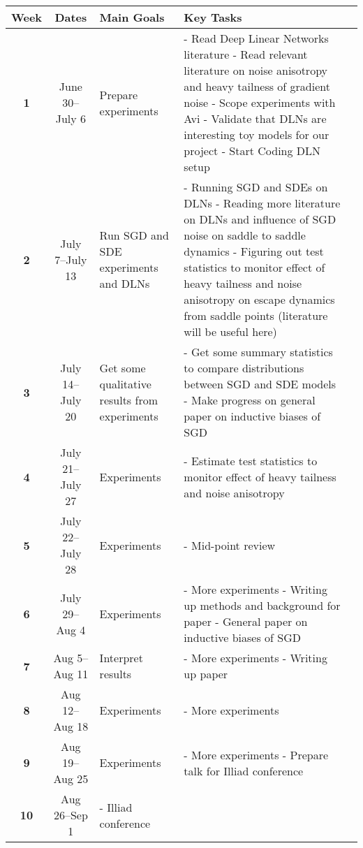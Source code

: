 \documentclass[11pt]{article}
\begin{document}
\begin{longtable}{>{\bfseries}c | c | m{4cm} | m{5cm} | m{4cm}}
\toprule
Week & Dates & Main Goals & Key Tasks \\
\midrule
1 & June 30--July 6 & Prepare experiments & 
- Read Deep Linear Networks literature \newline 
- Read relevant literature on noise anisotropy and heavy tailness of gradient noise \newline 
- Scope experiments with Avi \newline
- Validate that DLNs are interesting toy models for our project\newline
- Start Coding DLN setup\\
\midrule
2 & July 7--July 13 & Run SGD and SDE experiments and DLNs & 
- Running SGD and SDEs on DLNs \newline
- Reading more literature on DLNs and influence of SGD noise on saddle to saddle dynamics \newline
- Figuring out test statistics to monitor effect of heavy tailness and noise anisotropy on escape dynamics from saddle points (literature will be useful here)\\
\midrule
3 & July 14--July 20 & Get some qualitative results from experiments & 
- Get some summary statistics to compare distributions between SGD and SDE models \newline
- Make progress on general paper on inductive biases of SGD\\
\midrule
4 & July 21--July 27 & Experiments & 
- Estimate test statistics to monitor effect of heavy tailness and noise anisotropy \\
\midrule
5 & July 22--July 28 & Experiments & 
- Mid-point review \\
\midrule
6 & July 29--Aug 4 & Experiments & 
- More experiments \newline
- Writing up methods and background for paper \newline
- General paper on inductive biases of SGD\\
\midrule
7 & Aug 5--Aug 11 & Interpret results & 
- More experiments \newline
- Writing up paper \\
\midrule
8 & Aug 12--Aug 18 & Experiments & 
- More experiments \\
\midrule
9 & Aug 19--Aug 25 & Experiments & 
- More experiments \newline
- Prepare talk for Illiad conference \\
\midrule
10 & Aug 26--Sep 1 & 
- Illiad conference \\
\bottomrule
\end{longtable}
\end{document}
